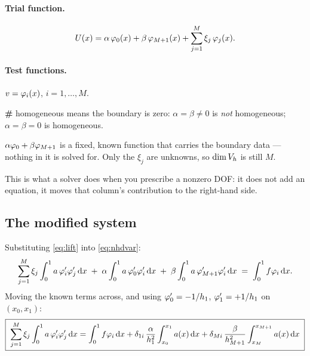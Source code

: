 \paragraph{Trial function.}
\begin{equation}\label{eq:lift}
  U(x) = \alpha\,\varphi_{0}(x) + \beta\,\varphi_{M+1}(x)
         + \sum_{j=1}^{M}\xi_{j}\,\varphi_{j}(x).
\end{equation}
\paragraph{Test functions.} $v=\varphi_{i}(x)$, $i=1,\dots,M$.

\medskip
\noindent
\textbf{\#} homogeneous means the boundary is zero:
$\alpha=\beta\ne0$ is \emph{not} homogeneous; $\alpha=\beta=0$ is homogeneous.

\begin{intuition}
$\alpha\varphi_{0}+\beta\varphi_{M+1}$ is a fixed, known function that carries the
boundary data --- nothing in it is solved for. Only the $\xi_{j}$ are unknowns,
so $\dim V_{h}$ is still $M$.

This is what a solver does when you prescribe a nonzero DOF: it does not add an
equation, it moves that column's contribution to the right-hand side.
\end{intuition}

\subsection*{The modified system}

Substituting \eqref{eq:lift} into \eqref{eq:nhdvar}:
\begin{equation}
  \sum_{j=1}^{M}\xi_{j}\int_{0}^{1} a\,\varphi_{i}'\varphi_{j}'\,\mathrm{d} x
  \;+\;\alpha\int_{0}^{1} a\,\varphi_{0}'\varphi_{i}'\,\mathrm{d} x
  \;+\;\beta\int_{0}^{1} a\,\varphi_{M+1}'\varphi_{i}'\,\mathrm{d} x
  \;=\;\int_{0}^{1} f\varphi_{i}\,\mathrm{d} x .
\end{equation}
Moving the known terms across, and using
$\varphi_{0}'=-1/h_{1}$, $\varphi_{1}'=+1/h_{1}$ on $(x_{0},x_{1})$:
\begin{equation}\label{eq:nhdsystem}
  \boxed{\;
  \sum_{j=1}^{M}\xi_{j}\int_{0}^{1} a\,\varphi_{i}'\varphi_{j}'\,\mathrm{d} x
  = \int_{0}^{1} f\varphi_{i}\,\mathrm{d} x
  + \delta_{1i}\,\frac{\alpha}{h_{1}^{2}}\int_{x_{0}}^{x_{1}} a(x)\,\mathrm{d} x
  + \delta_{Mi}\,\frac{\beta}{h_{M+1}^{2}}\int_{x_{M}}^{x_{M+1}} a(x)\,\mathrm{d} x \;}
\end{equation}

